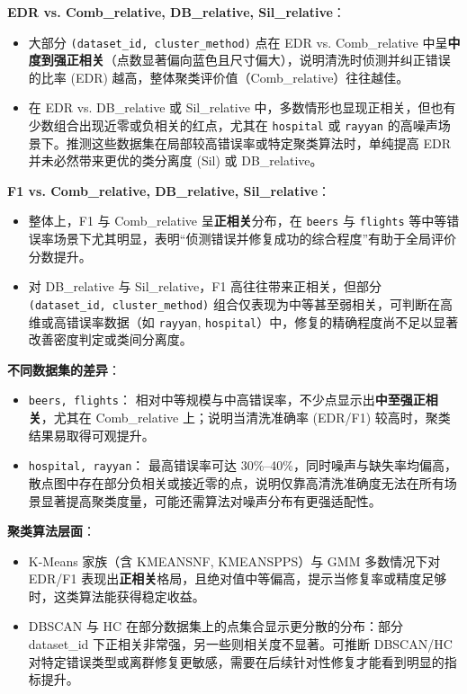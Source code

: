 \documentclass[10pt]{article} %
\numberwithin{equation}{section}
\begin{document}
\begin{enumerate}[label=(\alph*)]
\textbf{EDR vs. Comb\_relative, DB\_relative, Sil\_relative}：
    \begin{itemize}
        \item 大部分 \texttt{(dataset\_id, cluster\_method)} 点在 EDR vs. Comb\_relative 中呈\textbf{中度到强正相关}（点数显著偏向蓝色且尺寸偏大），说明清洗时侦测并纠正错误的比率 (EDR) 越高，整体聚类评价值（Comb\_relative）往往越佳。  
        \item 在 EDR vs. DB\_relative 或 Sil\_relative 中，多数情形也显现正相关，但也有少数组合出现近零或负相关的红点，尤其在 \texttt{hospital} 或 \texttt{rayyan} 的高噪声场景下。推测这些数据集在局部较高错误率或特定聚类算法时，单纯提高 EDR 并未必然带来更优的类分离度 (Sil) 或 DB\_relative。
    \end{itemize}

\textbf{F1 vs. Comb\_relative, DB\_relative, Sil\_relative}：
    \begin{itemize}
        \item 整体上，F1 与 Comb\_relative 呈\textbf{正相关}分布，在 \texttt{beers} 与 \texttt{flights} 等中等错误率场景下尤其明显，表明“侦测错误并修复成功的综合程度”有助于全局评价分数提升。  
        \item 对 DB\_relative 与 Sil\_relative，F1 高往往带来正相关，但部分 \texttt{(dataset\_id, cluster\_method)} 组合仅表现为中等甚至弱相关，可判断在高维或高错误率数据（如 \texttt{rayyan}, \texttt{hospital}）中，修复的精确程度尚不足以显著改善密度判定或类间分离度。
    \end{itemize}

\textbf{不同数据集的差异}：
    \begin{itemize}
        \item \texttt{beers, flights}： 相对中等规模与中高错误率，不少点显示出\textbf{中至强正相关}，尤其在 Comb\_relative 上；说明当清洗准确率 (EDR/F1) 较高时，聚类结果易取得可观提升。  
        \item \texttt{hospital, rayyan}： 最高错误率可达 30\%--40\%，同时噪声与缺失率均偏高，散点图中存在部分负相关或接近零的点，说明仅靠高清洗准确度无法在所有场景显著提高聚类度量，可能还需算法对噪声分布有更强适配性。
    \end{itemize}

\textbf{聚类算法层面}：
    \begin{itemize}
        \item K-Means 家族（含 KMEANSNF, KMEANSPPS）与 GMM 多数情况下对 EDR/F1 表现出\textbf{正相关}格局，且绝对值中等偏高，提示当修复率或精度足够时，这类算法能获得稳定收益。  
        \item DBSCAN 与 HC 在部分数据集上的点集合显示更分散的分布：部分 dataset\_id 下正相关非常强，另一些则相关度不显著。可推断 DBSCAN/HC 对特定错误类型或离群修复更敏感，需要在后续针对性修复才能看到明显的指标提升。
    \end{itemize}


\end{enumerate}
\end{document}
